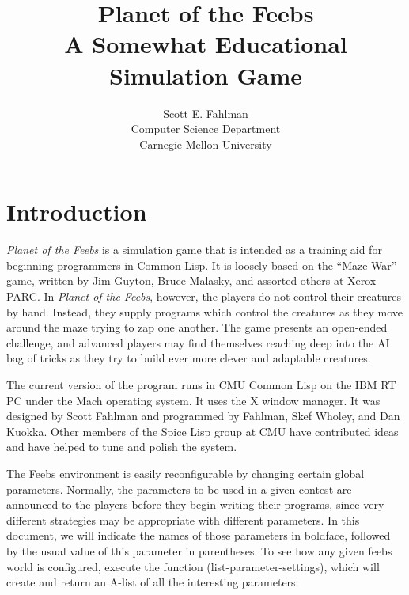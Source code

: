 \documentclass[12pt]{article}
\begin{document}
\title{Planet of the Feebs\\
A Somewhat Educational Simulation Game}

\author{Scott E. Fahlman\\
Computer Science Department\\
Carnegie-Mellon University}


\maketitle

\section{Introduction}

{\em Planet of the Feebs} is a simulation game that is intended as a
training aid for beginning programmers in Common Lisp.  It is loosely
based on the ``Maze War'' game, written by Jim Guyton, Bruce Malasky,
and assorted others at Xerox PARC.  In {\em Planet of the Feebs},
however, the players do not control their creatures by hand.  Instead,
they supply programs which control the creatures as they move around
the maze trying to zap one another.  The game presents an open-ended
challenge, and advanced players may find themselves reaching deep into
the AI bag of tricks as they try to build ever more clever and
adaptable creatures.

The current version of the program runs in CMU Common Lisp on the IBM RT
PC under the Mach operating system.  It uses the X window manager.  It
was designed by Scott Fahlman and programmed by Fahlman, Skef Wholey,
and Dan Kuokka.  Other members of the Spice Lisp group at CMU have
contributed ideas and have helped to tune and polish the system.

The Feebs environment is easily reconfigurable by changing certain
global parameters.  Normally, the parameters to be used in a given
contest are announced to the players before they begin writing their
programs, since very different strategies may be appropriate with
different parameters.  In this document, we will indicate the names of
those parameters in boldface, followed by the usual value of this
parameter in parentheses.  To see how any given feebs world is
configured, execute the function (list-parameter-settings), which will
create and return an A-list of all the interesting parameters:
\end{document}
